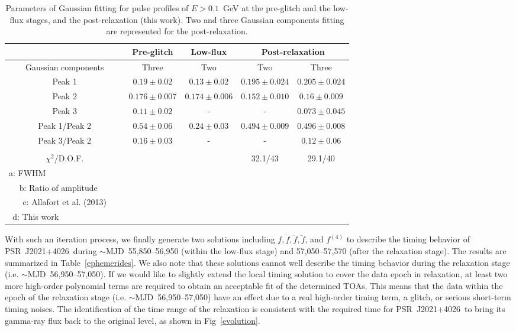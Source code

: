 \documentclass[12pt,preprint]{aastex}
\newcommand{\psr}{PSR~J2021+4026}
\begin{document}
\begin{table*}
  \centering
  \begin{tabular}{ccccc}
    \hline\hline
    & Pre-glitch & Low-flux & \multicolumn{2}{c}{Post-relaxation} \\
    \hline
    Gaussian components& Three\tablenotemark{c} & Two\tablenotemark{c}  & Two\tablenotemark{d}  & Three\tablenotemark{d}  \\
    Peak 1\tablenotemark{a}\dotfill & $0.19\pm 0.02$ & $0.13\pm 0.02$ & $0.195\pm 0.024$ & $0.205\pm 0.024$ \\
    Peak 2\tablenotemark{a}\dotfill & $0.176\pm 0.007$ & $0.174\pm 0.006$ & $0.152\pm 0.010$ & $0.16\pm 0.009$ \\
    Peak 3\tablenotemark{a}\dotfill & $0.11\pm 0.02$ & - & - & $0.073\pm 0.045$ \\
    
    Peak 1/Peak 2\tablenotemark{b}\dotfill & $0.54\pm 0.06$ & $0.24\pm 0.03$ & $0.494\pm 0.009$ & $0.496\pm 0.008$ \\
    Peak 3/Peak 2\tablenotemark{b}\dotfill & $0.16\pm 0.03$ & - & - & $0.12\pm 0.06$ \\
    &  &  &  &  \\
    $\chi^2$/D.O.F. &  &  & 32.1/43 & 29.1/40 \\
    \hline
        {\footnotesize a: FWHM~~~~~~~~~~~~~~~~~~} &&&&\\
        {\footnotesize b: Ratio of amplitude~~~} &&&&\\
        {\footnotesize c: Allafort et al. (2013)} &&&&\\
        {\footnotesize d: This work~~~~~~~~~~~~~~} &&&&\\
  \end{tabular}
  \caption{Parameters of Gaussian fitting for pulse profiles of $E >0.1$~GeV at the pre-glitch and the
    low-flux stages, and the post-relaxation (this work).
    Two and three Gaussian components fitting are represented for  the
    post-relaxation.}
\end{table*}


With such an iteration process, we finally generate two solutions including $f, \dot{f}, \ddot{f}, \dddot{f}$, and $f^{(4)}$ to describe the timing behavior of \psr\ during $\sim$MJD~55,850--56,950 (within the low-flux stage) and 57,050--57,570 (after the relaxation stage).
The results are summarized in Table~\ref{ephemerides}.
We also note that these solutions cannot well describe the timing behavior during the relaxation stage (i.e. $\sim$MJD~56,950--57,050).
If we would like to slightly extend the local timing solution to cover the data epoch in relaxation, at least two more high-order polynomial terms are required to obtain an acceptable fit of the determined TOAs.
This means that the data within the epoch of the relaxation stage (i.e. $\sim$MJD~56,950--57,050) have an effect due to a real high-order timing term,
a glitch,  or serious short-term timing noises.
The identification of the time range of the relaxation is consistent with the required time for \psr\ to bring its gamma-ray flux back to the original level, as shown in Fig~\ref{evolution}.
\end{document}
